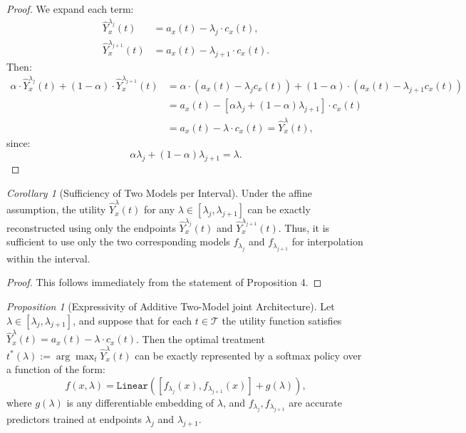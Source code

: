 \documentclass{article}
\theoremstyle{remark}
\newtheorem{proposition}{Proposition}
\newtheorem{corollary}{Corollary}
\begin{document}
\begin{proof}
We expand each term:
\begin{align*}
\hat{Y}_x^{\lambda_j}(t) &= a_x(t) - \lambda_j \cdot c_x(t), \\
\hat{Y}_x^{\lambda_{j+1}}(t) &= a_x(t) - \lambda_{j+1} \cdot c_x(t).
\end{align*}
Then:
\begin{align*}
\alpha \cdot \hat{Y}_x^{\lambda_j}(t) + (1 - \alpha) \cdot \hat{Y}_x^{\lambda_{j+1}}(t)
&= \alpha \cdot (a_x(t) - \lambda_j c_x(t)) + (1 - \alpha) \cdot (a_x(t) - \lambda_{j+1} c_x(t)) \\
&= a_x(t) - [\alpha \lambda_j + (1 - \alpha) \lambda_{j+1}] \cdot c_x(t) \\
&= a_x(t) - \lambda \cdot c_x(t) = \hat{Y}_x^\lambda(t),
\end{align*}
since:
\[
\alpha \lambda_j + (1 - \alpha) \lambda_{j+1} = \lambda.
\]
\end{proof}

\begin{corollary}[Sufficiency of Two Models per Interval]
Under the affine assumption, the utility $\hat{Y}_x^\lambda(t)$ for any $\lambda \in [\lambda_j, \lambda_{j+1}]$ can be exactly reconstructed using only the endpoints $\hat{Y}_x^{\lambda_j}(t)$ and $\hat{Y}_x^{\lambda_{j+1}}(t)$. Thus, it is sufficient to use only the two corresponding models $f_{\lambda_j}$ and $f_{\lambda_{j+1}}$ for interpolation within the interval.
\end{corollary}

\begin{proof}
    This follows immediately from the statement of Proposition 4.
\end{proof}

\begin{proposition}[Expressivity of Additive Two-Model joint Architecture]
Let $\lambda \in [\lambda_j, \lambda_{j+1}]$, and suppose that for each $t \in \mathcal{T}$ the utility function satisfies $\hat{Y}_x^\lambda(t) = a_x(t) - \lambda \cdot c_x(t)$. Then the optimal treatment $t^*(\lambda) := \arg\max_{t} \hat{Y}_x^\lambda(t)$ can be exactly represented by a softmax policy over a function of the form:
\[
f(x, \lambda) = \texttt{Linear} \left( [f_{\lambda_j}(x), f_{\lambda_{j+1}}(x)] + g(\lambda) \right),
\]
where $g(\lambda)$ is any differentiable embedding of $\lambda$, and $f_{\lambda_j}, f_{\lambda_{j+1}}$ are accurate predictors trained at endpoints $\lambda_j$ and $\lambda_{j+1}$.
\end{proposition}
\end{document}
